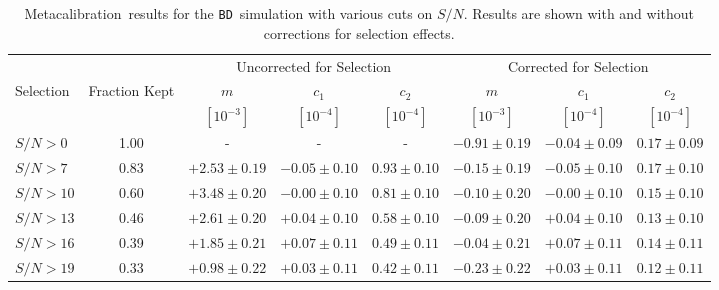 \documentclass[usegraphicx,usenatbib]{mn2e}
\newcommand{\snr}{$S/N$}
\newcommand{\Mcal}{Metacalibration}
\newcommand{\bdsim}{\texttt{BD}}
\begin{document}
\begin{table}
    \centering
    \caption{\Mcal\ results for the \bdsim\ simulation with various
        cuts on \snr.   Results are shown with and without corrections
        for selection effects.
    \label{tab:results_sel}}
    \begin{tabular}{ |l| |c| c|c|c|  c|c|c|}
        \hline
        & & \multicolumn{3}{c}{Uncorrected for Selection}                      & \multicolumn{3}{c}{Corrected for Selection} \\
        Selection           & Fraction Kept & $m$             & $c_1$            & $c_2$            & $m$               & $c_1$            & $c_2$ \\
                            &          & $[10^{-3}]$      & $[10^{-4}]$      & $[10^{-4}]$      & $[10^{-3}]$       & $[10^{-4}]$      & $[10^{-4}]$ \\
        \hline
        $\mbox{\snr} > 0$   & 1.00     & -                & -                & -                & $-0.91 \pm 0.19$  & $-0.04 \pm 0.09$ & $0.17 \pm 0.09$  \\
        $\mbox{\snr} > 7$   & 0.83     & $+2.53 \pm 0.19$ & $-0.05 \pm 0.10$ & $0.93 \pm 0.10$  & $-0.15 \pm 0.19$  & $-0.05 \pm 0.10$ & $0.17 \pm 0.10$  \\
        $\mbox{\snr} > 10$  & 0.60     & $+3.48 \pm 0.20$ & $-0.00 \pm 0.10$ & $0.81 \pm 0.10$  & $-0.10 \pm 0.20$  & $-0.00 \pm 0.10$ & $0.15 \pm 0.10$  \\
        $\mbox{\snr} > 13$  & 0.46     & $+2.61 \pm 0.20$ & $+0.04 \pm 0.10$ & $0.58 \pm 0.10$  & $-0.09 \pm 0.20$  & $+0.04 \pm 0.10$ & $0.13 \pm 0.10$  \\
        $\mbox{\snr} > 16$  & 0.39     & $+1.85 \pm 0.21$ & $+0.07 \pm 0.11$ & $0.49 \pm 0.11$  & $-0.04 \pm 0.21$  & $+0.07 \pm 0.11$ & $0.14 \pm 0.11$  \\
        $\mbox{\snr} > 19$  & 0.33     & $+0.98 \pm 0.22$ & $+0.03 \pm 0.11$ & $0.42 \pm 0.11$  & $-0.23 \pm 0.22$  & $+0.03 \pm 0.11$ & $0.12 \pm 0.11$  \\



\end{tabular}
\end{table}
\end{document}
